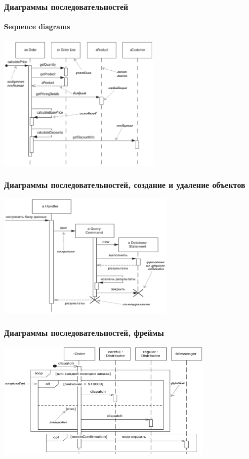 \documentclass[xetex,mathserif,serif]{beamer}
\begin{document}
	\begin{frame}
		\frametitle{Диаграммы последовательностей}
		\framesubtitle{Sequence diagrams}
		\begin{center}
			\includegraphics[width=0.6\textwidth]{sequenceDiagram.png}
		\end{center}
	\end{frame}

	\begin{frame}
		\frametitle{Диаграммы последовательностей, создание и удаление объектов}
		\begin{center}
			\includegraphics[width=0.65\textwidth]{sequenceLifeCycle.png}
		\end{center}
	\end{frame}

	\begin{frame}
		\frametitle{Диаграммы последовательностей, фреймы}
		\begin{center}
			\includegraphics[width=0.8\textwidth]{sequenceFrames.png}
		\end{center}
	\end{frame}
\end{document}
